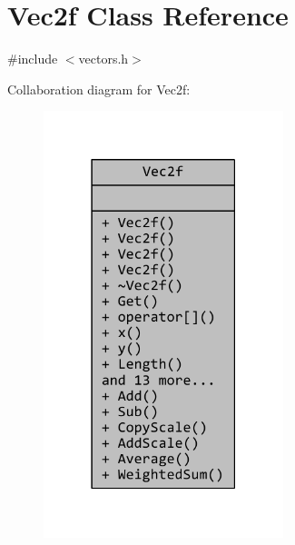 \hypertarget{classVec2f}{\section{Vec2f Class Reference}
\label{classVec2f}
}


{\ttfamily \#include $<$vectors.\+h$>$}



Collaboration diagram for Vec2f\+:
\nopagebreak
\begin{figure}[H]
\begin{center}
\leavevmode
\includegraphics[width=198pt]{classVec2f__coll__graph}
\end{center}
\end{figure}
